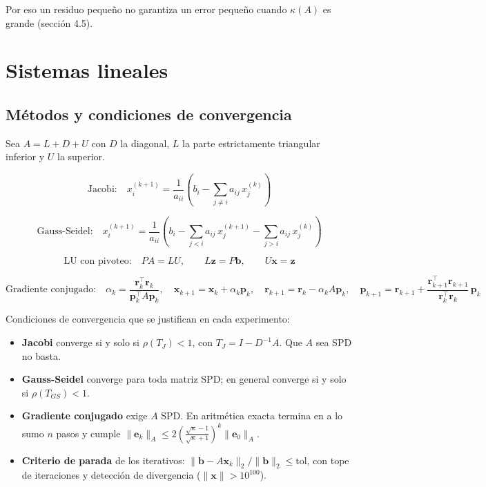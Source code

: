 \documentclass[
  11pt,
  letterpaper,
]{article}
\providecommand{\tightlist}{%
  \setlength{\itemsep}{0pt}\setlength{\parskip}{0pt}}
\begin{document}
Por eso un residuo pequeño no garantiza un error pequeño cuando
\(\kappa(A)\) es grande (sección 4.5).

\hypertarget{sistemas}{%
\section{Sistemas lineales}\label{sistemas}}

\hypertarget{muxe9todos-y-condiciones-de-convergencia}{%
\subsection{Métodos y condiciones de
convergencia}\label{muxe9todos-y-condiciones-de-convergencia}}

Sea \(A=L+D+U\) con \(D\) la diagonal, \(L\) la parte estrictamente
triangular inferior y \(U\) la superior.

\[\text{Jacobi:}\quad x_i^{(k+1)}=\frac{1}{a_{ii}}\left(b_i-\sum_{j\neq i}a_{ij}\,x_j^{(k)}\right)\]

\[\text{Gauss-Seidel:}\quad x_i^{(k+1)}=\frac{1}{a_{ii}}\left(b_i-\sum_{j<i}a_{ij}\,x_j^{(k+1)}-\sum_{j>i}a_{ij}\,x_j^{(k)}\right)\]

\[\text{LU con pivoteo:}\quad PA=LU,\qquad L\mathbf{z}=P\mathbf{b},\qquad U\mathbf{x}=\mathbf{z}\]

\[\text{Gradiente conjugado:}\quad \alpha_k=\frac{\mathbf{r}_k^{\top}\mathbf{r}_k}{\mathbf{p}_k^{\top}A\mathbf{p}_k},\quad \mathbf{x}_{k+1}=\mathbf{x}_k+\alpha_k\mathbf{p}_k,\quad \mathbf{r}_{k+1}=\mathbf{r}_k-\alpha_kA\mathbf{p}_k,\quad \mathbf{p}_{k+1}=\mathbf{r}_{k+1}+\frac{\mathbf{r}_{k+1}^{\top}\mathbf{r}_{k+1}}{\mathbf{r}_k^{\top}\mathbf{r}_k}\,\mathbf{p}_k\]

Condiciones de convergencia que se justifican en cada experimento:

\begin{itemize}
\tightlist
\item
  \textbf{Jacobi} converge si y solo si \(\rho(T_J)<1\), con
  \(T_J=I-D^{-1}A\). Que \(A\) sea SPD no basta.
\item
  \textbf{Gauss-Seidel} converge para toda matriz SPD; en general
  converge si y solo si \(\rho(T_{GS})<1\).
\item
  \textbf{Gradiente conjugado} exige \(A\) SPD. En aritmética exacta
  termina en a lo sumo \(n\) pasos y cumple
  \(\lVert \mathbf{e}_k\rVert_A\le 2\left(\tfrac{\sqrt{\kappa}-1}{\sqrt{\kappa}+1}\right)^{k}\lVert \mathbf{e}_0\rVert_A\).
\item
  \textbf{Criterio de parada} de los iterativos:
  \(\lVert \mathbf{b}-A\mathbf{x}_k\rVert_2/\lVert \mathbf{b}\rVert_2\le\mathrm{tol}\),
  con tope de iteraciones y detección de divergencia
  (\(\lVert \mathbf{x}\rVert>10^{100}\)).
\end{itemize}
\end{document}

